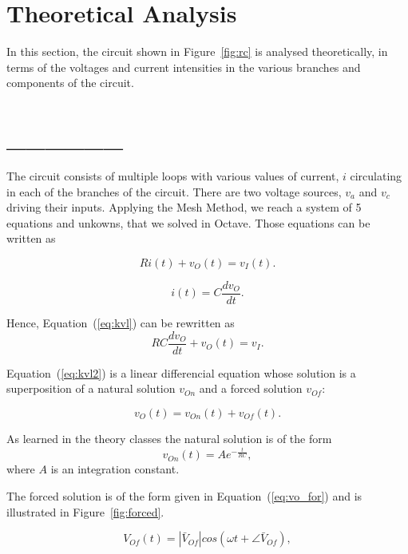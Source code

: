 \section{Theoretical Analysis}
\label{sec:analysis}

In this section, the circuit shown in Figure~\ref{fig:rc} is analysed
theoretically, in terms of the voltages and current intensities in the various branches and components of the circuit.

\section{______}

The circuit consists of multiple loops with various values of current, $i$ circulating in each of the branches of the circuit. There are two
voltage sources, $v_a$ and $v_c$ driving their inputs. Applying the Mesh Method, we reach a system of 5 equations and unkowns, that we solved in Octave. Those equations can be written as

\begin{equation}
  Ri(t) + v_O(t) = v_I(t).
  \label{eq:kvl}
\end{equation}

\begin{equation}
  i(t) = C\frac{dv_O}{dt}.
\end{equation}

Hence, Equation~(\ref{eq:kvl}) can be rewritten as
\begin{equation}
  RC\frac{dv_O}{dt} + v_O(t) = v_I.
  \label{eq:kvl2}
\end{equation}

Equation~(\ref{eq:kvl2}) is a linear differencial equation whose solution is a
superposition of a natural solution $v_{On}$ and a forced solution $v_{Of}$:

\begin{equation}
  v_O(t) = v_{On}(t) + v_{Of}(t).
  \label{eq:vo_sol}
\end{equation}

As learned in the theory classes the natural solution is of the form
\begin{equation}
  v_{On}(t) = Ae^{-\frac{t}{RC}},
  \label{eq:vo_nat}
\end{equation}
where $A$ is an integration constant.

The forced solution is of the form given in Equation~(\ref{eq:vo_for}) and is
illustrated in Figure~\ref{fig:forced}.

\begin{equation}
  V_{Of}(t) = |\bar{V}_{Of}| cos(\omega t + \angle \bar{V}_{Of}),
  \label{eq:vo_for}
\end{equation}

